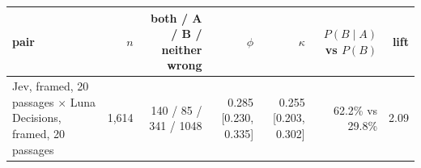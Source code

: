 \begin{tabular}{lrrrrrr}
\toprule
pair & $n$ & both / A / B / neither wrong & $\phi$ & $\kappa$ & $P(B \mid A)$ vs $P(B)$ & lift \\
\midrule
Jev, framed, 20 passages $\times$ Luna Decisions, framed, 20 passages & 1,614 & 140 / 85 / 341 / 1048 & 0.285 [0.230, 0.335] & 0.255 [0.203, 0.302] & 62.2\% vs 29.8\% & 2.09 \\
\bottomrule
\end{tabular}
